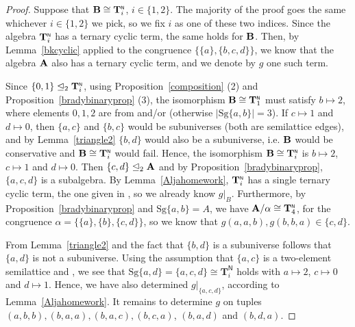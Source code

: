\documentclass[11pt]{amsart}
\newcommand{\m}[1]{\mathbf{\uppercase{#1}}}
\newcommand{\n}{\scriptscriptstyle{\mathsf{N}}}
\theoremstyle{definition}
\theoremstyle{remark}
\theoremstyle{plain}
\def\T{\mathbf{T}}
\begin{document}
\begin{proof}
Suppose that ${\m B}\cong {\m T}_i^{\n}$, $i\in\{1,2\}$. The majority of the proof goes the same whichever $i\in\{1,2\}$ we pick, so we fix $i$ as one of these two indices. Since the algebra ${\m T}_i^{\n}$ has a ternary cyclic term, the same holds for $\m b$. Then, by Lemma~\ref{bkcyclic} applied to the congruence $\{\{a\},\{b,c,d\}\}$, we know that the algebra $\m A$ also has a ternary cyclic term, and we denote by $g$ one such term.

Since $\{0,1\}\trianglelefteq_2 {\m T}_i^{\n}$, using Proposition~\ref{composition} (2) and Proposition~\ref{bradybinaryprop} (3), the isomorphism ${\m B}\cong {\m T}_1^{\n}$ must satisfy $b\mapsto 2$, where elements $0,1,2$ are from  and/or  (otherwise $|\mathrm{Sg}\{a,b\}|=3$). If $c\mapsto 1$ and $d\mapsto 0$, then $\{a,c\}$ and $\{b,c\}$ would be subuniverses (both are semilattice edges), and by Lemma~\ref{triangle2} $\{b,d\}$ would also be a subuniverse, i.e. $\m b$ would be conservative and ${\m B}\cong {\m T}_i^{\n}$ would fail. Hence, the isomorphism ${\m B}\cong {\m T}_i^{\n}$ is $b\mapsto 2$, $c\mapsto 1$ and $d\mapsto 0$. Then $\{c,d\}\trianglelefteq_2 {\m A}$ and by Proposition~\ref{bradybinaryprop}, $\{a,c,d\}$ is a subalgebra. By Lemma~\ref{Aljahomework}, ${\m T}_i^{\n}$ has a single ternary cyclic term, the one given in , so we already know $g|_B$. Furthermore, by Proposition~\ref{bradybinaryprop} and $\mathrm{Sg}\{a,b\}=A$, we have ${\m A}/\alpha\cong \m T_4^{\n}$, for the congruence $\alpha=\{\{a\},\{b\},\{c,d\}\}$, so we know that $g(a,a,b), g(b,b,a)\in \{c,d\}$.

From Lemma~\ref{triangle2} and the fact that $\{b,d\}$ is a subuniverse follows that $\{a,d\}$ is not a subuniverse. Using the assumption that $\{a,c\}$ is a two-element semilattice and , we see that $\mathrm{Sg}\{a,d\}=\{a,c,d\}\cong {\T}_i^{\n}$ holds with $a\mapsto 2$, $c\mapsto 0$ and $d\mapsto 1$. Hence, we have also determined $g|_{\{a,c,d\}}$, according to Lemma~\ref{Aljahomework}. It remains to determine $g$ on tuples $(a,b,b), (b,a,a), (b,a,c), (b,c,a)$, $(b,a,d)$ and $(b,d,a)$. 


\end{proof}
\end{document}

